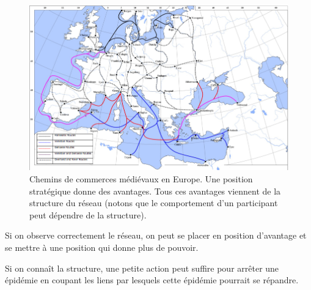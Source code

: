 \begin{figure}[!ht]
\centering
\includegraphics[width=0.9\linewidth]{images/map_of_medieval_trade_routes.png}
\caption{Chemins de commerces médiévaux en Europe. Une position
    stratégique donne des avantages. Tous ces avantages viennent de la
    structure du réseau (notons que le comportement d'un participant
peut dépendre de la structure).}
\end{figure}

Si on observe correctement le réseau, on peut se placer en position d'avantage et se mettre à une position qui donne plus de pouvoir.

Si on connaît la structure, une petite action peut suffire pour arrêter une épidémie en coupant les liens par lesquels cette épidémie pourrait se répandre.
